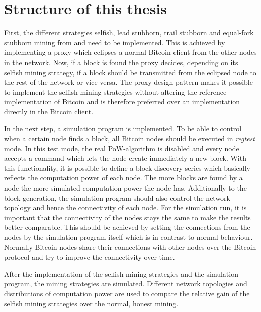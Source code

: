 \section{Structure of this thesis}

First, the different strategies selfish, lead stubborn, trail stubborn and equal-fork stubborn mining from \cite{nayak2016stubborn} and \cite{eyal2014majority} need to be implemented.
This is achieved by implementing a proxy which eclipses a normal Bitcoin client from the other nodes in the network.
Now, if a block is found the proxy decides, depending on its selfish mining strategy, if a block should be transmitted from the eclipsed node to the rest of the network or vice versa.
The proxy design pattern makes it possible to implement the selfish mining strategies without altering the reference implementation of Bitcoin and is therefore preferred over an implementation directly in the Bitcoin client.

In the next step, a simulation program is implemented.
To be able to control when a certain node finds a block, all Bitcoin nodes should be executed in \textit{regtest} mode.
In this test mode, the real PoW-algorithm is disabled and every node accepts a command which lets the node create immediately a new block.
With this functionality, it is possible to define a block discovery series which basically reflects the computation power of each node.
The more blocks are found by a node the more simulated computation power the node has.
Additionally to the block generation, the simulation program should also control the network topology and hence the connectivity of each node.
For the simulation run, it is important that the connectivity of the nodes stays the same to make the results better comparable.
This should be achieved by setting the connections from the nodes by the simulation program itself which is in contrast to normal behaviour.
Normally Bitcoin nodes share their connections with other nodes over the Bitcoin protocol and try to improve the connectivity over time.

After the implementation of the selfish mining strategies and the simulation program, the mining strategies are simulated.
Different network topologies and distributions of computation power are used to compare the relative gain of the selfish mining strategies over the normal, honest mining.
